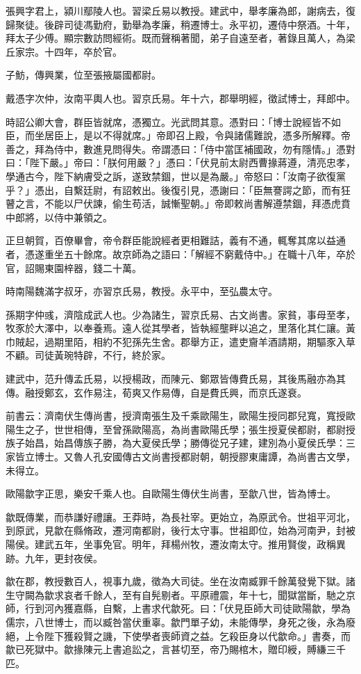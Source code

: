 \begin{pinyinscope}
張興字君上，潁川鄢陵人也。習梁丘易以教授。建武中，舉孝廉為郎，謝病去，復歸聚徒。後辟司徒馮勤府，勤舉為孝廉，稍遷博士。永平初，遷侍中祭酒。十年，拜太子少傅。顯宗數訪問經術。既而聲稱著聞，弟子自遠至者，著錄且萬人，為梁丘家宗。十四年，卒於官。

子魴，傳興業，位至張掖屬國都尉。

戴憑字次仲，汝南平輿人也。習京氏易。年十六，郡舉明經，徵試博士，拜郎中。

時詔公卿大會，群臣皆就席，憑獨立。光武問其意。憑對曰：「博士說經皆不如臣，而坐居臣上，是以不得就席。」帝即召上殿，令與諸儒難說，憑多所解釋。帝善之，拜為侍中，數進見問得失。帝謂憑曰：「侍中當匡補國政，勿有隱情。」憑對曰：「陛下嚴。」帝曰：「朕何用嚴？」憑曰：「伏見前太尉西曹掾蔣遵，清亮忠孝，學通古今，陛下納膚受之訴，遂致禁錮，世以是為嚴。」帝怒曰：「汝南子欲復黨乎？」憑出，自繫廷尉，有詔敕出。後復引見，憑謝曰：「臣無謇諤之節，而有狂瞽之言，不能以尸伏諫，偷生苟活，誠慚聖朝。」帝即敕尚書解遵禁錮，拜憑虎賁中郎將，以侍中兼領之。

正旦朝賀，百僚畢會，帝令群臣能說經者更相難詰，義有不通，輒奪其席以益通者，憑遂重坐五十餘席。故京師為之語曰：「解經不窮戴侍中。」在職十八年，卒於官，詔賜東園梓器，錢二十萬。

時南陽魏滿字叔牙，亦習京氏易，教授。永平中，至弘農太守。

孫期字仲彧，濟陰成武人也。少為諸生，習京氏易、古文尚書。家貧，事母至孝，牧豕於大澤中，以奉養焉。遠人從其學者，皆執經壟畔以追之，里落化其仁讓。黃巾賊起，過期里陌，相約不犯孫先生舍。郡舉方正，遣吏齎羊酒請期，期驅豕入草不顧。司徒黃琬特辟，不行，終於家。

建武中，范升傳孟氏易，以授楊政，而陳元、鄭眾皆傳費氏易，其後馬融亦為其傳。融授鄭玄，玄作易注，荀爽又作易傳，自是費氏興，而京氏遂衰。

前書云：濟南伏生傳尚書，授濟南張生及千乘歐陽生，歐陽生授同郡兒寬，寬授歐陽生之子，世世相傳，至曾孫歐陽高，為尚書歐陽氏學；張生授夏侯都尉，都尉授族子始昌，始昌傳族子勝，為大夏侯氏學；勝傳從兄子建，建別為小夏侯氏學：三家皆立博士。又魯人孔安國傳古文尚書授都尉朝，朝授膠東庸譚，為尚書古文學，未得立。

歐陽歙字正思，樂安千乘人也。自歐陽生傳伏生尚書，至歙八世，皆為博士。

歙既傳業，而恭謙好禮讓。王莽時，為長社宰。更始立，為原武令。世祖平河北，到原武，見歙在縣脩政，遷河南都尉，後行太守事。世祖即位，始為河南尹，封被陽侯。建武五年，坐事免官。明年，拜楊州牧，遷汝南太守。推用賢俊，政稱異跡。九年，更封夜侯。

歙在郡，教授數百人，視事九歲，徵為大司徒。坐在汝南臧罪千餘萬發覺下獄。諸生守闕為歙求哀者千餘人，至有自髡剔者。平原禮震，年十七，聞獄當斷，馳之京師，行到河內獲嘉縣，自繫，上書求代歙死。曰：「伏見臣師大司徒歐陽歙，學為儒宗，八世博士，而以臧咎當伏重辜。歙門單子幼，未能傳學，身死之後，永為廢絕，上令陛下獲殺賢之譏，下使學者喪師資之益。乞殺臣身以代歙命。」書奏，而歙已死獄中。歙掾陳元上書追訟之，言甚切至，帝乃賜棺木，贈印綬，賻縑三千匹。


\end{pinyinscope}
